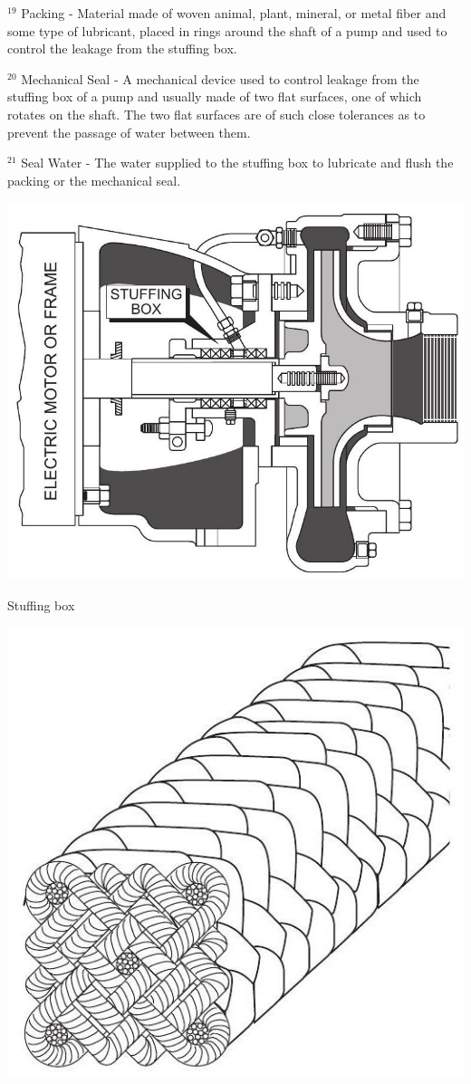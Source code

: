 \documentclass[10pt]{article}
\begin{document}
${ }^{19}$ Packing - Material made of woven animal, plant, mineral, or metal fiber and some type of lubricant, placed in rings around the shaft of a pump and used to control the leakage from the stuffing box.

${ }^{20}$ Mechanical Seal - A mechanical device used to control leakage from the stuffing box of a pump and usually made of two flat surfaces, one of which rotates on the shaft. The two flat surfaces are of such close tolerances as to prevent the passage of water between them.

${ }^{21}$ Seal Water - The water supplied to the stuffing box to lubricate and flush the packing or the mechanical seal.

\includegraphics[max width=\textwidth]{CentrifugalPumpStuffingBox}

Stuffing box

\includegraphics[max width=\textwidth]{CentrifugalPumpStuffingBraidedFabric}
\end{document}
